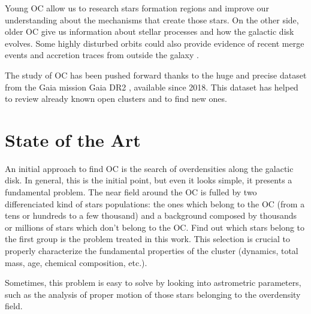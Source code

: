 \documentclass[11pt, a4paper, english]{book}
\begin{document}
Young OC allow us to research stars formation regions and improve our understanding about the mechanisms that create those stars.
On the other side, older OC give us information about stellar processes and how the galactic disk evolves.
Some highly disturbed orbits could also provide evidence of recent merge events and accretion traces from outside the galaxy
\cite{cantat2016abundances}.

The study of OC has been pushed forward thanks to the huge and precise dataset from the Gaia mission
\cite{collaboration2016description} Gaia DR2 \cite{gaia2018gaia}, available since 2018.
This dataset has helped to review already known open clusters and to find new ones.

\chapter{State of the Art}

An initial approach to find OC is the search of overdensities along the galactic disk. In general, this is the initial point,
but even it looks simple, it presents a fundamental problem. The near field around the OC is fulled by two differenciated
kind of stars populations: the ones which belong to the OC (from a tens or hundreds to a few thousand) and a background composed
by thousands or millions of stars which don't belong to the OC. Find out which stars belong to the first group is the problem
treated in this work. This selection is crucial to properly characterize the fundamental properties of the cluster
(dynamics, total mass, age, chemical composition, etc.).

Sometimes, this problem is easy to solve by looking into astrometric parameters, such as the analysis of proper motion of those
stars belonging to the overdensity field.
\end{document}

